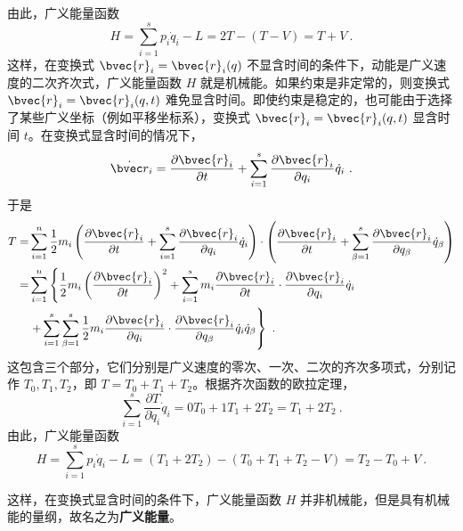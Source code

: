 由此，广义能量函数
\begin{equation}
H=\sum_{i=1}^{s} p_{i} \dot{q}_{i}-L=2 T-(T-V)=T+V~.
\end{equation}
这样，在变换式 $\bvec{r}_{i}=\bvec{r}_{i}(q)$ 不显含时间的条件下，动能是广义速度的二次齐次式，广义能量函数 $H $ 就是机械能。如果约束是非定常的，则变换式 $\bvec{r}_{i}=\bvec{r}_{i}(q, t)$ 难免显含时间。即使约束是稳定的，也可能由于选择了某些广义坐标（例如平移坐标系），变换式 $\bvec{r}_{i}=\bvec{r}_{i}(q, t)$ 显含时间 $t $。在变换式显含时间的情况下，
\begin{equation}
\dot{\bvec r}_{i}=\frac{\partial \bvec{r}_{i}}{\partial t}+\sum_{i=1}^{s} \frac{\partial \bvec{r}_{i}}{\partial q_{i}} \dot{q}_{i}~.
\end{equation}
于是
\begin{equation}
\begin{aligned} T=& \sum_{i=1}^{n} \frac{1}{2} m_{i}\left(\frac{\partial \bvec{r}_{i}}{\partial t}+\sum_{i=1}^{s} \frac{\partial \bvec{r}_{i}}{\partial q_{i}} \dot{q}_{i}\right) \cdot\left(\frac{\partial \bvec{r}_{i}}{\partial t}+\sum_{\beta=1}^{s} \frac{\partial \bvec{r}_{i}}{\partial q_{\beta}} \dot{q}_{\beta}\right) \\=& \sum_{i=1}^{n}\left\{\frac{1}{2} m_{i}\left(\frac{\partial \bvec{r}_{i}}{\partial t}\right)^{2}+\sum_{i=1}^{s} m_{i} \frac{\partial \bvec{r}_{i}}{\partial t} \cdot \frac{\partial \bvec{r}_{i}}{\partial q_{i}} \dot{q}_{i}\right.\\ &\left.+\sum_{i=1}^{s} \sum_{\beta=1}^{s} \frac{1}{2} m_{i} \frac{\partial \bvec{r}_{i}}{\partial q_{i}} \cdot \frac{\partial \bvec{r}_{i}}{\partial q_{\beta}} \dot{q}_{i} \dot{q}_{\beta}\right\} ~.\end{aligned}
\end{equation}
这包含三个部分，它们分别是广义速度的零次、一次、二次的齐次多项式，分别记作 $T_0,T_1,T_2$，即 $T=T_0+T_1+T_2$。根据齐次函数的欧拉定理，
\begin{equation}
\sum_{i=1}^{s} \frac{\partial T}{\partial \dot{q}_{i}} \dot{q}_{i}=0 T_{0}+1 T_{1}+2 T_{2}=T_{1}+2 T_{2}~.
\end{equation}
由此，广义能量函数
\begin{equation}
H=\sum_{i=1}^{s} p_{i} \dot{q}_{i}-L=\left(T_{1}+2 T_{2}\right)-\left(T_{0}+T_{1}+T_{2}-V\right)=T_{2}-T_{0}+V~.
\end{equation}

这样，在变换式显含时间的条件下，广义能量函数 $H $ 并非机械能，但是具有机械能的量纲，故名之为\textbf{广义能量}。


